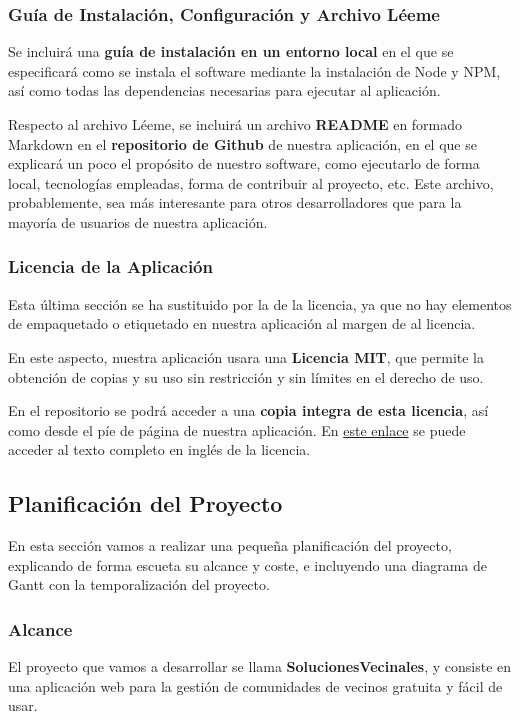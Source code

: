 \subsubsection{Guía de Instalación, Configuración y Archivo Léeme} 
Se incluirá una \textbf{guía de instalación en un entorno local} en el que se especificará como se instala el software mediante la instalación de Node y NPM, así como todas las dependencias necesarias para ejecutar al aplicación. 

Respecto al archivo Léeme, se incluirá un archivo \textbf{README} en formado \gls{Markdown} en el \textbf{repositorio de Github} de nuestra aplicación, en el que se explicará un poco el propósito de nuestro software, como ejecutarlo de forma local, tecnologías empleadas, forma de contribuir al proyecto, etc. Este archivo, probablemente, sea más interesante para otros desarrolladores que para la mayoría de usuarios de nuestra aplicación.

\subsubsection{Licencia de la Aplicación}
Esta última sección se ha sustituido por la de la licencia, ya que no hay elementos de empaquetado  o etiquetado en nuestra aplicación al margen de al licencia.

En este aspecto, nuestra aplicación usara una \textbf{Licencia MIT}, que permite la obtención de copias y su uso sin restricción y sin límites en el derecho de uso. \cite{mit}

En el repositorio se podrá acceder a una \textbf{copia integra de esta licencia}, así como desde el píe de página de nuestra aplicación. En \href{https://opensource.org/license/mit}{este enlace} se puede acceder al texto completo en inglés de la licencia.


\subsection{Planificación del Proyecto}
En esta sección vamos a realizar una pequeña planificación del proyecto, explicando de forma escueta su alcance y coste, e incluyendo una diagrama de Gantt con la temporalización del proyecto.

\subsubsection{Alcance}
El proyecto que vamos a desarrollar se llama \textbf{SolucionesVecinales}, y consiste en una aplicación web para la gestión de comunidades de vecinos gratuita y fácil de usar.

